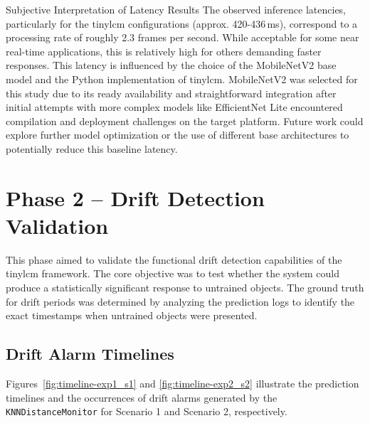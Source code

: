 \begin{MyBox}{Subjective Interpretation of Latency Results}
	The observed inference latencies, particularly for the \gls{tinylcm} configurations (approx. 420-436\,\si{\milli\second}), correspond to a processing rate of roughly 2.3 frames per second. While acceptable for some near real-time applications, this is relatively high for others demanding faster responses. This latency is influenced by the choice of the MobileNetV2 base model and the Python implementation of \gls{tinylcm}. MobileNetV2 was selected for this study due to its ready availability and straightforward integration after initial attempts with more complex models like EfficientNet Lite encountered compilation and deployment challenges on the target platform. Future work could explore further model optimization or the use of different base architectures to potentially reduce this baseline latency.
\end{MyBox}

\section{Phase 2 – Drift Detection Validation}
\label{sec:phase2_results_drift}

This phase aimed to validate the functional drift detection capabilities of the \gls{tinylcm} framework. The core objective was to test whether the system could produce a statistically significant response to untrained objects. The ground truth for drift periods was determined by analyzing the prediction logs to identify the exact timestamps when untrained objects were presented.

\subsection{Drift Alarm Timelines}
\label{ssec:phase2_alarm_timelines}

Figures~\ref{fig:timeline-exp1_s1} and \ref{fig:timeline-exp2_s2} illustrate the prediction timelines and the occurrences of drift alarms generated by the \texttt{KNNDistanceMonitor} for Scenario 1 and Scenario 2, respectively.

